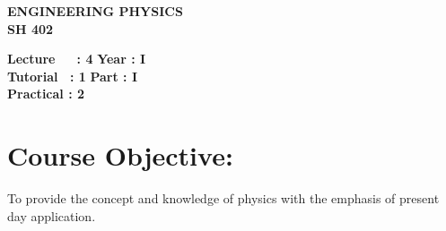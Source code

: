 \begin{center}
    \textbf{\huge{\uppercase{Engineering Physics}}}
    \\
    \vspace{.5cm}
    \textbf{\large{SH 402}}
\end{center}

\noindent\textbf{Lecture\ \ \ : 4} \hfill \textbf{Year : I } \\
\textbf{Tutorial \ : 1} \hfill \textbf{Part : I } \\
\textbf{Practical : 2}  \\

\par
\noindent 
\section*{Course Objective:}
To provide the concept and knowledge of physics with the emphasis of present day application.

